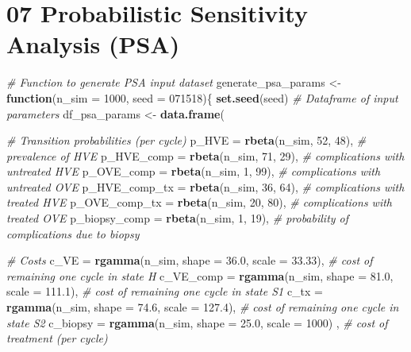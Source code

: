 \documentclass[
]{article}
\newenvironment{Shaded}{\begin{snugshade}}{\end{snugshade}}
\newcommand{\CommentTok}[1]{\textcolor[rgb]{0.56,0.35,0.01}{\textit{#1}}}
\newcommand{\ControlFlowTok}[1]{\textcolor[rgb]{0.13,0.29,0.53}{\textbf{#1}}}
\newcommand{\DataTypeTok}[1]{\textcolor[rgb]{0.13,0.29,0.53}{#1}}
\newcommand{\DecValTok}[1]{\textcolor[rgb]{0.00,0.00,0.81}{#1}}
\newcommand{\FloatTok}[1]{\textcolor[rgb]{0.00,0.00,0.81}{#1}}
\newcommand{\KeywordTok}[1]{\textcolor[rgb]{0.13,0.29,0.53}{\textbf{#1}}}
\newcommand{\NormalTok}[1]{#1}
\newcommand{\StringTok}[1]{\textcolor[rgb]{0.31,0.60,0.02}{#1}}
\begin{document}
\hypertarget{probabilistic-sensitivity-analysis-psa}{%
\section{07 Probabilistic Sensitivity Analysis
(PSA)}\label{probabilistic-sensitivity-analysis-psa}}

\begin{Shaded}
\begin{Highlighting}[]
\CommentTok{# Function to generate PSA input dataset}
\NormalTok{generate_psa_params <-}\StringTok{ }\ControlFlowTok{function}\NormalTok{(}\DataTypeTok{n_sim =} \DecValTok{1000}\NormalTok{, }\DataTypeTok{seed =} \DecValTok{071518}\NormalTok{)\{}
  \KeywordTok{set.seed}\NormalTok{(seed)}
  \CommentTok{# Dataframe of input parameters}
\NormalTok{  df_psa_params   <-}\StringTok{ }\KeywordTok{data.frame}\NormalTok{(}
    
    \CommentTok{# Transition probabilities (per cycle)}
    \DataTypeTok{p_HVE         =} \KeywordTok{rbeta}\NormalTok{(n_sim, }\DecValTok{52}\NormalTok{, }\DecValTok{48}\NormalTok{), }\CommentTok{# prevalence of HVE}
    \DataTypeTok{p_HVE_comp    =} \KeywordTok{rbeta}\NormalTok{(n_sim, }\DecValTok{71}\NormalTok{, }\DecValTok{29}\NormalTok{), }\CommentTok{# complications with untreated HVE}
    \DataTypeTok{p_OVE_comp    =} \KeywordTok{rbeta}\NormalTok{(n_sim,  }\DecValTok{1}\NormalTok{, }\DecValTok{99}\NormalTok{), }\CommentTok{# complications with untreated OVE}
    \DataTypeTok{p_HVE_comp_tx =} \KeywordTok{rbeta}\NormalTok{(n_sim, }\DecValTok{36}\NormalTok{, }\DecValTok{64}\NormalTok{), }\CommentTok{# complications with treated HVE}
    \DataTypeTok{p_OVE_comp_tx =} \KeywordTok{rbeta}\NormalTok{(n_sim, }\DecValTok{20}\NormalTok{, }\DecValTok{80}\NormalTok{), }\CommentTok{# complications with treated OVE}
    \DataTypeTok{p_biopsy_comp =} \KeywordTok{rbeta}\NormalTok{(n_sim,  }\DecValTok{1}\NormalTok{, }\DecValTok{19}\NormalTok{), }\CommentTok{# probability of complications due to biopsy}
    
    \CommentTok{# Costs}
    \DataTypeTok{c_VE      =} \KeywordTok{rgamma}\NormalTok{(n_sim, }\DataTypeTok{shape =} \FloatTok{36.0}\NormalTok{, }\DataTypeTok{scale =} \FloatTok{33.33}\NormalTok{), }\CommentTok{# cost of remaining one cycle in state H}
    \DataTypeTok{c_VE_comp =} \KeywordTok{rgamma}\NormalTok{(n_sim, }\DataTypeTok{shape =} \FloatTok{81.0}\NormalTok{, }\DataTypeTok{scale =} \FloatTok{111.1}\NormalTok{), }\CommentTok{# cost of remaining one cycle in state S1}
    \DataTypeTok{c_tx      =} \KeywordTok{rgamma}\NormalTok{(n_sim, }\DataTypeTok{shape =} \FloatTok{74.6}\NormalTok{, }\DataTypeTok{scale =} \FloatTok{127.4}\NormalTok{), }\CommentTok{# cost of remaining one cycle in state S2}
    \DataTypeTok{c_biopsy  =} \KeywordTok{rgamma}\NormalTok{(n_sim, }\DataTypeTok{shape =} \FloatTok{25.0}\NormalTok{, }\DataTypeTok{scale =} \DecValTok{1000}\NormalTok{) , }\CommentTok{# cost of treatment (per cycle)}
    

\end{Highlighting}
\end{Shaded}
\end{document}
